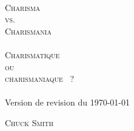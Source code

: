 
\pagestyle{empty}

\makeatletter
\begin{titlepage}
\begin{center}
\mbox{}
\vfill
\HRule \\[0.4cm]
\textsc{ \Huge %
    {Charisma\\ vs.\\[0.4cm] Charismania\\[0.4cm]\HRule\\[0.4cm]}{}
Charismatique\\ ou\\[0.4cm] \og charismaniaque \fg{}~?}\\[0.4cm]

\HRule \\[1.5cm]

%
   {\Large Version de revision du \today}{}

\textsc{\Large Chuck Smith}\\[1.5cm]
\vfill
\mbox{}
\end{center}
\end{titlepage}
\makeatother

